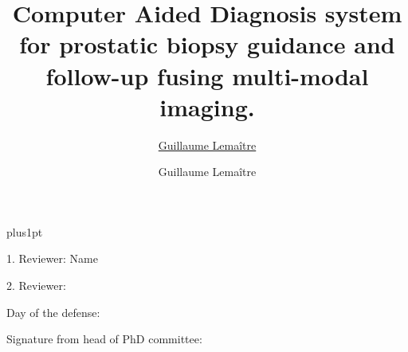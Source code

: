 \documentclass[twoside,11pt]{Latex/Classes/PhDthesisPSnPDF}
\title{Computer Aided Diagnosis system for prostatic biopsy guidance and follow-up fusing multi-modal imaging.
}
\author{\href{mailto:guillaume.lemaitre@udg.edu}{Guillaume Lema\^itre}}
\author{Guillaume Lema\^itre}
\begin{document}

\renewcommand\baselinestretch{1.2}
\baselineskip=18pt plus1pt



\maketitle  %



\newpage
\vspace{10mm}
1. Reviewer: Name

\vspace{10mm}
2. Reviewer: 

\vspace{20mm}
Day of the defense:

\vspace{20mm}
\hspace{70mm}Signature from head of PhD committee:







%  



\frontmatter





\setcounter{secnumdepth}{3} %
\setcounter{tocdepth}{3}    %
\tableofcontents            %
\end{document}
